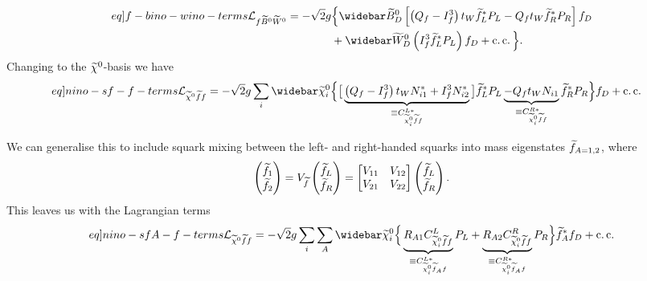 \documentclass[english, notitlepage]{article}
\begin{document}
            \begin{align}
                \label[eq]{f-bino-wino-terms}
                \nonumber
                \L_{f\bino\wino} = -\sqrt{2} g & \Big\{ \wbar{\wtilde{B}}^0_D \bclosed{ \pclosed{Q_f - I^3_f} t_W \wtilde{f}_L^\ast P_L - Q_f t_W \wtilde{f}_R^\ast P_R } f_D \\
                                               & + \wbar{\wtilde{W}}^0_D \pclosed{I^3_f \wtilde{f}_L^\ast P_L} f_D + \cc \Big\}.
            \end{align}
            Changing to the $\nino[]$-basis we have
            \begin{align}
                \label[eq]{nino-sf-f-terms}
                \L_{\nino[]\wtilde{f}f} = -\sqrt{2} g \sum_{i} \wbar{\wtilde{\chi}}^0_i & \Big\{ \big[ \underbrace{\pclosed{Q_f - I^3_f}t_W N_{i1}^\ast  + I^3_f N_{i2}^\ast}_{\equiv C_{\nino[i] \wtilde{f} f}^{L\ast}} \big] \wtilde{f}_L^\ast P_L \underbrace{- Q_f t_W N_{i1}}_{\equiv C_{\nino[i] \wtilde{f} f}^{R\ast}} \wtilde{f}_R^\ast P_R \Big\} f_D + \cc
            \end{align}

            We can generalise this to include squark mixing between the left- and right-handed squarks into mass eigenstates \(\wtilde{f}_{A=1,2}\), where
            \begin{align}
                \begin{pmatrix}
                    \wtilde{f}_1 \\
                    \wtilde{f}_2
                \end{pmatrix}
                =
                V_{\wtilde{f}} \begin{pmatrix}
                                   \wtilde{f}_L \\
                                   \wtilde{f}_R
                               \end{pmatrix}
                =
                \begin{bmatrix}
                    V_{11} & V_{12} \\
                    V_{21} & V_{22}
                \end{bmatrix}
                \begin{pmatrix}
                    \wtilde{f}_L \\
                    \wtilde{f}_R
                \end{pmatrix}.
            \end{align}
            This leaves us with the Lagrangian terms
            \begin{align}
                \label[eq]{nino-sfA-f-terms}
                \L_{\nino[] \wtilde{f} f} = -\sqrt{2} g \sum_{i} \sum_{A} \wbar{\wtilde{\chi}}^0_i & \Big\{ \underbrace{R_{A1} C_{\nino[i] \wtilde{f} f}^{L}}_{\equiv C_{\nino[i] \wtilde{f}_A f}^{L\ast}} P_L + \underbrace{R_{A2} C_{\nino[i] \wtilde{f} f}^{R}}_{\equiv C_{\nino[i] \wtilde{f}_A f}^{R\ast}} P_R \Big\} \wtilde{f}_A^\ast f_D + \cc \\
            \end{align}
\end{document}
